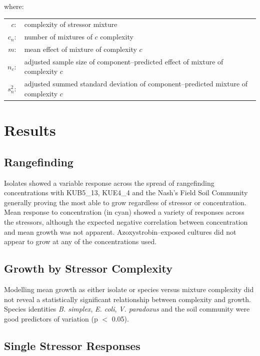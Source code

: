 \documentclass[final,1p,times]{elsarticle}
\begin{document}
\noindent where:

\begin{small}
\setlength{\tabcolsep}{1pt}
\begin{tabular}{r p{11cm}}
    $c :$ & complexity of stressor mixture \\
    $c_n :$ & number of mixtures of $c$ complexity \\
    $m :$ & mean effect of mixture of complexity $c$ \\
    $n_c :$ & adjusted sample size of component--predicted effect of mixture of complexity $c$ \\
    $s^2_n :$ & adjusted summed standard deviation of component--predicted mixture of complexity $c$ \\
\end{tabular}
\end{small}

\section{Results}
\label{S:3}

\subsection{Rangefinding}
\label{S:3:1}

Isolates showed a variable response across the spread of rangefinding concentrations with KUB5\_13, KUE4\_4 and the Nash's Field Soil Community generally proving the most able to grow regardless of stressor or concentration. Mean response to concentration (in cyan) showed a variety of responses across the stressors, although the expected negative correlation between concentration and mean growth was not apparent. Azoxystrobin--exposed cultures did not appear to grow at any of the concentrations used.

\subsection{Growth by Stressor Complexity}
\label{S:3:2}

Modelling mean growth as either isolate or species versus mixture complexity did not reveal a statistically significant relationship between complexity and growth. Species identities \textit{B. simplex}, \textit{E. coli}, \textit{V. paradoxus} and the soil community were good predictors of variation (p $<$ 0.05).

\subsection{Single Stressor Responses}
\label{S:3:3}
\end{document}
